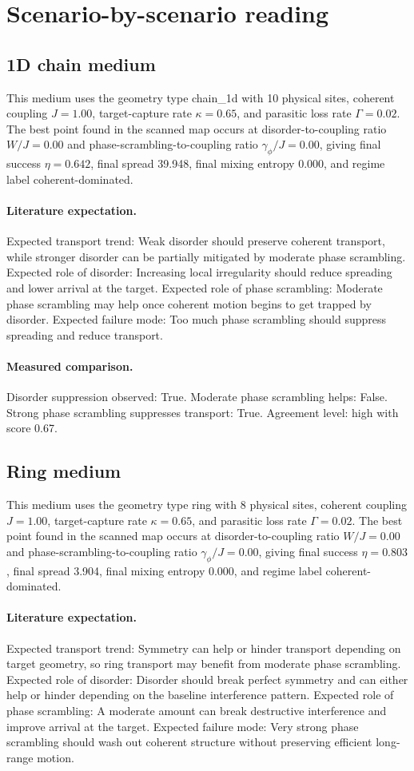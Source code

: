 \section{Scenario-by-scenario reading}
\subsection{1D chain medium}
This medium uses the geometry type chain\_1d with 10 physical sites, coherent coupling $J=1.00$, target-capture rate $\kappa=0.65$, and parasitic loss rate $\Gamma=0.02$.
The best point found in the scanned map occurs at disorder-to-coupling ratio $W/J=0.00$ and phase-scrambling-to-coupling ratio $\gamma_\phi/J=0.00$, giving final success $\eta=0.642$, final spread 39.948, final mixing entropy 0.000, and regime label coherent-dominated.
\paragraph{Literature expectation.}
Expected transport trend: Weak disorder should preserve coherent transport, while stronger disorder can be partially mitigated by moderate phase scrambling. Expected role of disorder: Increasing local irregularity should reduce spreading and lower arrival at the target. Expected role of phase scrambling: Moderate phase scrambling may help once coherent motion begins to get trapped by disorder. Expected failure mode: Too much phase scrambling should suppress spreading and reduce transport.
\paragraph{Measured comparison.}
Disorder suppression observed: True. Moderate phase scrambling helps: False. Strong phase scrambling suppresses transport: True. Agreement level: high with score 0.67.

\subsection{Ring medium}
This medium uses the geometry type ring with 8 physical sites, coherent coupling $J=1.00$, target-capture rate $\kappa=0.65$, and parasitic loss rate $\Gamma=0.02$.
The best point found in the scanned map occurs at disorder-to-coupling ratio $W/J=0.00$ and phase-scrambling-to-coupling ratio $\gamma_\phi/J=0.00$, giving final success $\eta=0.803$, final spread 3.904, final mixing entropy 0.000, and regime label coherent-dominated.
\paragraph{Literature expectation.}
Expected transport trend: Symmetry can help or hinder transport depending on target geometry, so ring transport may benefit from moderate phase scrambling. Expected role of disorder: Disorder should break perfect symmetry and can either help or hinder depending on the baseline interference pattern. Expected role of phase scrambling: A moderate amount can break destructive interference and improve arrival at the target. Expected failure mode: Very strong phase scrambling should wash out coherent structure without preserving efficient long-range motion.
